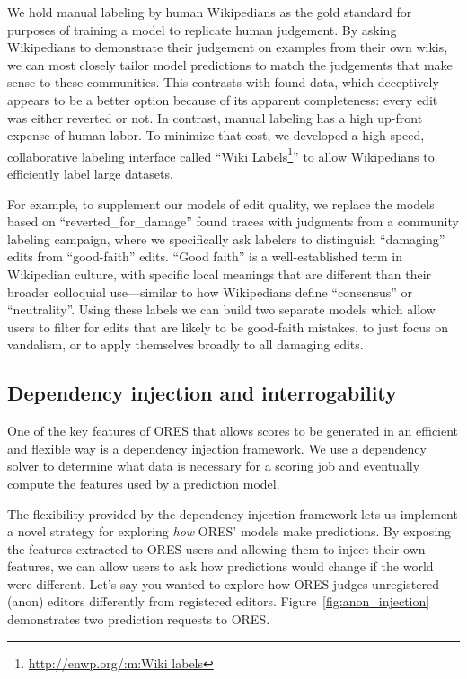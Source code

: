 %
We hold manual labeling by human Wikipedians as the gold standard for purposes of training a model to replicate human judgement.  By asking Wikipedians to demonstrate their judgement on examples from their own wikis, we can most closely tailor model predictions to match the judgements that make sense to these communities.  This contrasts with found data, which deceptively appears to be a better option because of its apparent completeness: every edit was either reverted or not.  In contrast, manual labeling has a high up-front expense of human labor.  To minimize that cost, we developed a high-speed, collaborative labeling interface called ``Wiki Labels\footnote{\url{http://enwp.org/:m:Wiki labels}}'' to allow Wikipedians to efficiently label large datasets.

For example, to supplement our models of edit quality, we replace the models based on ``reverted\_for\_damage'' found traces with judgments from a community labeling campaign, where we specifically ask labelers to distinguish ``damaging'' edits from ``good-faith'' edits. ``Good faith'' is a well-established term in Wikipedian culture, with specific local meanings that are different than their broader colloquial use---similar to how Wikipedians define ``consensus'' or ``neutrality''.  Using these labels we can build two separate models which allow users to filter for edits that are likely to be good-faith mistakes\cite{halfaker2017automated}, to just focus on vandalism, or to apply themselves broadly to all damaging edits.

\subsection{Dependency injection and interrogability}
One of the key features of ORES that allows scores to be generated in an efficient and flexible way is a dependency injection framework.  We use a dependency solver to determine what data is necessary for a scoring job and eventually compute the features used by a prediction model.

The flexibility provided by the dependency injection framework lets us implement a novel strategy for exploring \emph{how} ORES' models make predictions.  By exposing the features extracted to ORES users and allowing them to inject their own features, we can allow users to ask how predictions would change if the world were different.  Let's say you wanted to explore how ORES judges unregistered (anon) editors differently from registered editors.  Figure~\ref{fig:anon_injection} demonstrates two prediction requests to ORES.

